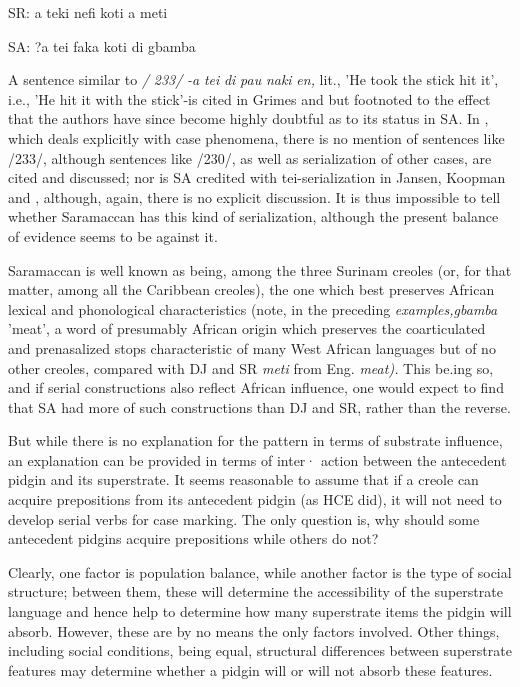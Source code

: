 \ea\label{ex:232}
 SR: a teki nefi koti a meti
\z

\ea\label{ex:233}
 SA: ?a tei faka koti di gbamba
\z

A sentence similar to \textit{/} \textit{233/} \textit{{}-}\textit{a} \textit{tei} \textit{di} \textit{pau} \textit{naki} \textit{en,} lit., 'He took the stick hit it', i.e., 'He hit it with the stick'{}-is cited in Grimes and \citet{Glock1970} but footnoted to the effect that the authors have since become highly doubtful as to its status in SA. In \citet{Glock1972}, which deals explicitly with case phenomena, there is no mention of sentences like
/233/, although sentences like /230/, as well as serialization of other cases, are cited and discussed; nor is SA credited with tei-serialization in Jansen, Koopman and \citet{Muysken1978}, although, again, there is no explicit discussion. It is thus impossible to tell whether Saramaccan has this kind of serialization, although the present balance of evidence seems to be against it.

Saramaccan is well known as being, among the three Surinam creoles (or, for that matter, among all the Caribbean creoles), the one which best preserves African lexical and phonological characteristics
(note, in the preceding \textit{examples,gbamba} 'meat', a word of presumably African origin which preserves the coarticulated and prenasalized stops characteristic of many West African languages but of no other creoles, compared with DJ and SR \textit{meti} from Eng. \textit{meat).} This be.ing so, and if serial constructions also reflect African influence, one would expect to find that SA had more of such constructions than DJ and SR, rather than the reverse.

But while there is no explanation for the pattern in terms of substrate influence, an explanation can be provided in terms of inter· action between the antecedent pidgin and its superstrate. It seems reasonable to assume that if a creole can acquire prepositions from its antecedent pidgin (as HCE did), it will not need to develop serial verbs for case marking. The only question is, why should some antecedent pidgins acquire prepositions while others do not?

Clearly, one factor is population balance, while another factor is the type of social structure; between them, these will determine the accessibility of the superstrate language and hence help to deter\-mine how many superstrate items the pidgin will absorb. However, these are by no means the only factors involved. Other things, including social conditions, being equal, structural differences between super\-strate features may determine whether a pidgin will or will not absorb these features.

